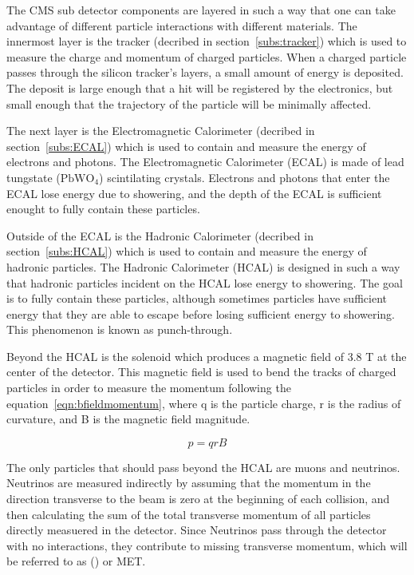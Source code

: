 The CMS sub detector components are layered in such a way that one can take advantage of different particle interactions with different materials.
The innermost layer is the tracker (decribed in section~\ref{subs:tracker}) which is used to measure the charge and momentum of charged particles.
When a charged particle passes through the silicon tracker's layers, a small amount of energy is deposited.
The deposit is large enough that a hit will be registered by the electronics, but small enough that the trajectory of the particle will be minimally affected.

The next layer is the Electromagnetic Calorimeter (decribed in section~\ref{subs:ECAL}) which is used to contain and measure the energy of electrons and photons.
The Electromagnetic Calorimeter (ECAL) is made of lead tungstate ($\mathrm{PbWO_{4}}$) scintilating crystals.
Electrons and photons that enter the ECAL lose energy due to showering, and the depth of the ECAL is sufficient enought to fully contain these particles.

Outside of the ECAL is the Hadronic Calorimeter (decribed in section~\ref{subs:HCAL}) which is used to contain and measure the energy of hadronic particles.
The Hadronic Calorimeter (HCAL) is designed in such a way that hadronic particles incident on the HCAL lose energy to showering.
The goal is to fully contain these particles, although sometimes particles have sufficient energy that they are able to escape before losing sufficient energy to showering.
This phenomenon is known as punch-through.

Beyond the HCAL is the solenoid which produces a magnetic field of 3.8 T at the center of the detector.
This magnetic field is used to bend the tracks of charged particles in order to measure the momentum following the equation~\ref{eqn:bfieldmomentum},
where q is the particle charge, r is the radius of curvature, and B is the magnetic field magnitude.

\begin{equation}
  \label{eqn:bfieldmomentum}
p = qrB
\end{equation}

The only particles that should pass beyond the HCAL are muons and neutrinos.
Neutrinos are measured indirectly by assuming that the momentum in the direction transverse to the beam is zero at the beginning of each collision,
and then calculating the sum of the total transverse momentum of all particles directly measuered in the detector.
Since Neutrinos pass through the detector with no interactions, they contribute to missing transverse momentum, which will be referred to as (\MET) or MET.

